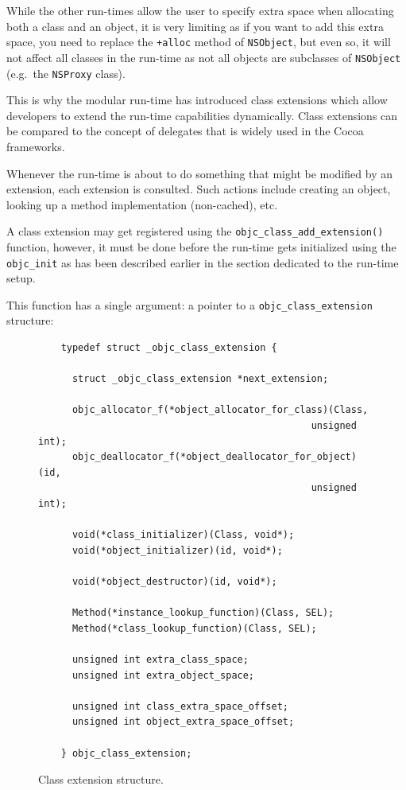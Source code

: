 While the other run-times allow the user to specify extra space when allocating both a class and an object, it is very limiting as if you want to add this extra space, you need to replace the \verb=+alloc= method of \verb=NSObject=, but even so, it will not affect all classes in the run-time as not all objects are subclasses of \verb=NSObject= (e.g.\ the \verb=NSProxy= class).

This is why the modular run-time has introduced class extensions which allow developers to extend the run-time capabilities dynamically. Class extensions can be compared to the concept of delegates that is widely used in the Cocoa frameworks. 

Whenever the run-time is about to do something that might be modified by an extension, each extension is consulted. Such actions include creating an object, looking up a method implementation (non-cached), etc.

A class extension may get registered using the \verb=objc_class_add_extension()= function, however, it must be done before the run-time gets initialized using the \verb=objc_init= as has been described earlier in the section dedicated to the run-time setup.

This function has a single argument: a pointer to a \verb=objc_class_extension= structure:

\begin{figure}[htbp] 
  \begin{verbatim}
    typedef struct _objc_class_extension {

      struct _objc_class_extension *next_extension;
      
      objc_allocator_f(*object_allocator_for_class)(Class,
                                                unsigned int);
      objc_deallocator_f(*object_deallocator_for_object)(id,
                                                unsigned int);
      
      void(*class_initializer)(Class, void*);
      void(*object_initializer)(id, void*);
      
      void(*object_destructor)(id, void*);
        
      Method(*instance_lookup_function)(Class, SEL);
      Method(*class_lookup_function)(Class, SEL);
      
      unsigned int extra_class_space;
      unsigned int extra_object_space;
      
      unsigned int class_extra_space_offset;
      unsigned int object_extra_space_offset;
      
    } objc_class_extension;
  \end{verbatim}
  \centering{}
  \caption{Class extension structure.}
  \label{fig:class_ext_struct}
\end{figure}

